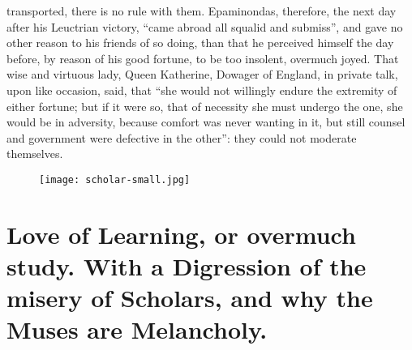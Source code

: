 transported, there is no rule with them. Epaminondas, therefore, the next day
after his Leuctrian victory, \enquote{came abroad all squalid and
submiss}, and gave no other reason to his friends of so doing, than that he
perceived himself the day before, by reason of his good fortune, to be too
insolent, overmuch joyed. That wise and virtuous lady,
Queen Katherine, Dowager of England, in private talk, upon
like occasion, said, that \enquote{she would not willingly endure
the extremity of either fortune; but if it were so, that of necessity she must
undergo the one, she would be in adversity, because comfort was never wanting
in it, but still counsel and government were defective in the other}: they
could not moderate themselves.

\cleartoleftpage{}
\begin{figure}[p]
  \begingroup
  \centering
  \texttt{[image: scholar-small.jpg]}
  \label{fig:scholar}
\end{figure}

\clearpage{}
\thispagestyle{titleontop}

\section[Love of Learning, or overmuch study.]{Love of Learning, or overmuch
study. With a Digression of the misery of Scholars, and why the Muses are
Melancholy.}

